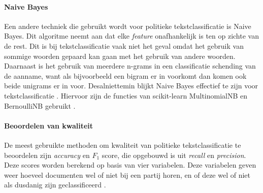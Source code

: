 \paragraph{Naive Bayes}
Een andere techniek die gebruikt wordt voor politieke tekstclassificatie is Naive Bayes. Dit algoritme neemt aan dat elke \textit{feature} onafhankelijk is ten op zichte van de rest. Dit is bij tekstclassificatie vaak niet het geval omdat het gebruik van sommige woorden gepaard kan gaan met het gebruik van andere woorden. Daarnaast is het gebruik van meerdere n-grams in een classificatie schending van de aanname, want als bijvoorbeeld een bigram er in voorkomt dan komen ook beide unigrams er in voor. Desalniettemin blijkt Naive Bayes effectief te zijn voor tekstclassificatie \cite{bhand,scikit-learn}. Hiervoor zijn de functies van scikit-learn MultinomialNB en BernoulliNB gebruikt \cite{bhand,scikit-learn}.\par

\paragraph{Beoordelen van kwaliteit}
De meest gebruikte methoden om kwaliteit van politieke tekstclassificatie te beoordelen zijn \textit{accuracy} en $F_1$ score, die opgebouwd is uit \textit{recall} en \textit{precision}. Deze scores worden berekend op basis van vier variabelen. Deze variabelen geven weer hoeveel documenten wel of niet bij een partij horen, en of deze wel of niet als dusdanig zijn geclassificeerd \cite{Manning:2008:IIR:1394399} .\par

